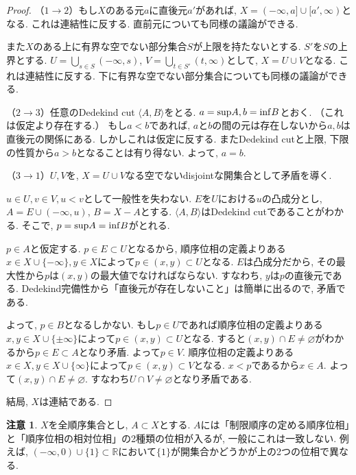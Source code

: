 \documentclass[a4paper, twoside]{bxjsarticle}
\newcommand{\rea}{\mathbb{R}}
\theoremstyle{definition}
\newtheorem{rem}[thm]{注意}
\begin{document}
        \begin{proof}
            （$1\to 2$）もし$X$のある元$a$に直後元$a'$があれば, $X=(-\infty, a]\cup[a', \infty)$となる. これは連結性に反する. 直前元についても同様の議論ができる.
            
            また$X$のある上に有界な空でない部分集合$S$が上限を持たないとする. $S'$を$S$の上界とする. $U=\bigcup_{s\in S}(-\infty, s)$, $V=\bigcup_{t\in S'}(t, \infty)$として, $X=U\cup V$となる. これは連結性に反する. 下に有界な空でない部分集合についても同様の議論ができる.
            
            （$2\to 3$）任意のDedekind cut $\langle A, B\rangle$をとる. $a = {\rm sup}A, b={\rm inf}B$とおく. （これは仮定より存在する.） もし$a<b$であれば, $a$と$b$の間の元は存在しないから$a, b$は直後元の関係にある. しかしこれは仮定に反する. またDedekind cutと上限, 下限の性質から$a>b$となることは有り得ない. よって, $a=b$.
            
            （$3\to 1$）$U, V$を, $X=U\cup V$なる空でないdisjointな開集合として矛盾を導く.
            
            $u\in U, v\in V, u<v$として一般性を失わない. $E$を$U$における$u$の凸成分とし, $A=E\cup(-\infty, u)$, $B=X-A$とする. $\langle A, B\rangle$はDedekind cutであることがわかる. そこで, $p = {\rm sup}A ={\rm inf}B$がとれる.
            
            $p\in A$と仮定する. $p\in E\subset U$となるから, 順序位相の定義よりある$x\in X\cup\{-\infty\}, y\in X$によって$p\in(x, y)\subset U$となる. $E$は凸成分だから, その最大性から$p$は$(x, y)$の最大値でなければならない. すなわち, $y$は$p$の直後元である. Dedekind完備性から「直後元が存在しないこと」は簡単に出るので, 矛盾である.
            
            よって, $p\in B$となるしかない. もし$p\in U$であれば順序位相の定義よりある$x, y\in X\cup\{\pm\infty\}$によって$p\in (x, y)\subset U$となる. すると$(x, y)\cap E\neq\varnothing$がわかるから$p\in E\subset A$となり矛盾. よって$p\in V$. 順序位相の定義よりある$x\in X, y\in X\cup\{\infty\}$によって$p\in (x, y)\subset V$となる. $x<p$であるから$x\in A$. よって$(x, y)\cap E\neq\varnothing$. すなわち$U\cap V\neq\varnothing$となり矛盾である.
            
            結局, $X$は連結である.
        \end{proof}
        \begin{rem}
            $X$を全順序集合とし, $A\subset X$とする. $A$には「制限順序の定める順序位相」と「順序位相の相対位相」の2種類の位相が入るが, 一般にこれは一致しない. 例えば, $(-\infty, 0)\cup \{1\}\subset \rea$において$\{1\}$が開集合かどうかが上の2つの位相で異なる.
        \end{rem}
\end{document}
